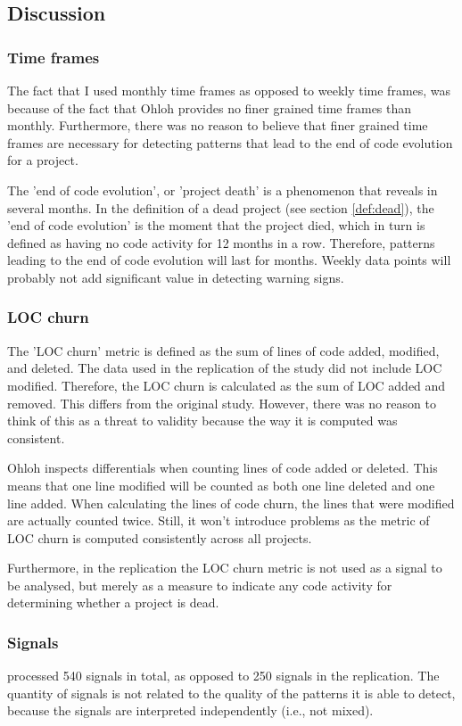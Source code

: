 \subsection{Discussion}
\subsubsection{Time frames}
The fact that I used monthly time frames as opposed to weekly time frames, was
because of the fact that Ohloh provides no finer grained time frames than
monthly. Furthermore, there was no reason to believe that finer grained time
frames are necessary for detecting patterns that lead to the end of code
evolution for a project.

The 'end of code evolution', or 'project death' is a phenomenon that reveals in
several months. In the definition of a dead project (see section
\ref{def:dead}), the 'end of code evolution' is the moment that the project
died, which in turn is defined as having no code activity for 12 months in a
row. Therefore, patterns leading to the end of code evolution will last for
months. Weekly data points will probably not add significant value in detecting
warning signs.

\subsubsection{LOC churn}
The 'LOC churn' metric is defined as the sum of lines of code added, modified,
and deleted. The data used in the replication of the study did not include LOC
modified. Therefore, the LOC churn is calculated as the sum of LOC added and
removed. This differs from the original study. However, there was no reason to
think of this as a threat to validity because the way it is computed was
consistent.

Ohloh inspects differentials when counting lines of code added or deleted. This
means that one line modified will be counted as both one line deleted and one
line added. When calculating the lines of code churn, the lines that were
modified are actually counted twice. Still, it won't introduce problems as the
metric of LOC churn is computed consistently across all projects.

Furthermore, in the replication the LOC churn metric is not used as a signal to
be analysed, but merely as a measure to indicate any code activity for
determining whether a project is dead.

\subsubsection{Signals}
\citeauthor{karus2013} processed 540 signals in total, as opposed to 250
signals in the replication. The quantity of signals is not related to the
quality of the patterns it is able to detect, because the signals are
interpreted independently (i.e., not mixed).


